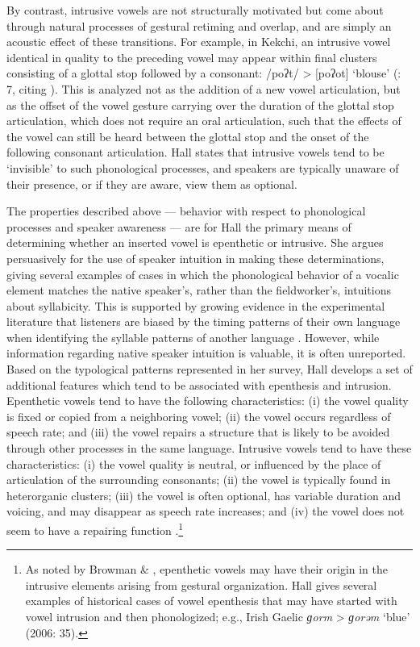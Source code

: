   By contrast, intrusive vowels are not structurally motivated but come about through natural processes of gestural retiming and overlap, and are simply an acoustic effect of these transitions. For example, in Kekchi, an intrusive vowel identical in quality to the preceding vowel may appear within final clusters consisting of a glottal stop followed by a consonant: /poʔt/ > [poʔot] ‘blouse’ (\citealt{Hall2006}: 7, citing \citealt{Campbell1974}). This is analyzed not as the addition of a new vowel articulation, but as the offset of the vowel gesture carrying over the duration of the glottal stop articulation, which does not require an oral articulation, such that the effects of the vowel can still be heard between the glottal stop and the onset of the following consonant articulation. Hall states that intrusive vowels tend to be ‘invisible’ to such phonological processes, and speakers are typically unaware of their presence, or if they are aware, view them as optional.

  The properties described above — behavior with respect to phonological processes and speaker awareness — are for Hall the primary means of determining whether an inserted vowel is epenthetic or intrusive. She argues persuasively for the use of speaker intuition in making these determinations, giving several examples of cases in which the phonological behavior of a vocalic element matches the native speaker’s, rather than the fieldworker’s, intuitions about syllabicity. This is supported by growing evidence in the experimental literature that listeners are biased by the timing patterns of their own language when identifying the syllable patterns of another language \citep{KwonEtAl2017}. However, while information regarding native speaker intuition is valuable, it is often unreported. Based on the typological patterns represented in her survey, Hall develops a set of additional features which tend to be associated with epenthesis and intrusion. Epenthetic vowels tend to have the following characteristics: (i) the vowel quality is fixed or copied from a neighboring vowel; (ii) the vowel occurs regardless of speech rate; and (iii) the vowel repairs a structure that is likely to be avoided through other processes in the same language. Intrusive vowels tend to have these characteristics: (i) the vowel quality is neutral, or influenced by the place of articulation of the surrounding consonants; (ii) the vowel is typically found in heterorganic clusters; (iii) the vowel is often optional, has variable duration and voicing, and may disappear as speech rate increases; and (iv) the vowel does not seem to have a repairing function \citep[391]{Hall2006}.\footnote{{As noted by Browman \& \citet[53]{Goldstein1992a}, epenthetic vowels may have their origin in the intrusive elements arising from gestural organization. Hall gives several examples of historical cases of vowel epenthesis that may have started with vowel intrusion and then phonologized; e.g., Irish Gaelic} \textrm{\textit{ɡorm}} > \textrm{\textit{ɡorəm}} \textrm{‘blue’ (2006: 35).}}


